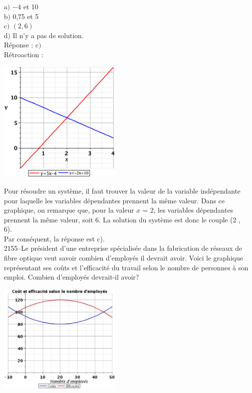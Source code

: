 \documentclass[letterpaper, 12pt]{article}
\begin{document}
a$)$ $-4$ et 10\\
b$)$ 0,75 et 5\\
c$)$ $(2 , 6)$\\
d$)$ Il n'y a pas de solution.\\

R\'eponse : c$)$\\

R\'etroaction :\\
\begin{center}
 \includegraphics[width=6cm,bb=20 118 575 673]{Q2154.eps}
\end{center}
Pour r\'esoudre un syst\`eme, il faut trouver la valeur de la variable ind\'ependante pour laquelle les variables d\'ependantes prennent la m\^eme valeur. Dans ce graphique, on remarque que, pour la valeur $x$ = 2, les variables d\'ependantes prennent la m\^eme valeur, soit 6. La solution du syst\`eme est donc le couple (2 , 6).\\
Par cons\'equent, la r\'eponse est c).\\

2155--Le pr\'esident d'une entreprise sp\'ecialis\'ee dans la fabrication de r\'eseaux de fibre optique veut savoir combien d'employ\'es il devrait avoir. Voici le graphique repr\'esentant ses co\^uts et l'efficacit\'e du travail selon le nombre de personnes \`a son emploi. Combien d'employ\'es devrait-il avoir? \\
\begin{center}
 \includegraphics[width=6cm,bb=14 14 527 476]{Q2155.eps}
\end{center}
\end{document}
